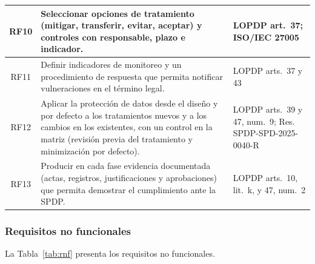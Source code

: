 \begin{table}[htbp]
\begin{tabularx}{\textwidth}{|c|L|p{3.6cm}|}
    \hline
    RF10 & Seleccionar opciones de tratamiento (mitigar, transferir, evitar, aceptar) y controles con responsable, plazo e indicador. & LOPDP art.~37; ISO/IEC 27005 \\
    \hline
    RF11 & Definir indicadores de monitoreo y un procedimiento de respuesta que permita notificar vulneraciones en el término legal. & LOPDP arts.~37 y 43 \\
    \hline
    RF12 & Aplicar la protección de datos desde el diseño y por defecto a los tratamientos nuevos y a los cambios en los existentes, con un control en la matriz (revisión previa del tratamiento y minimización por defecto). & LOPDP arts.~39 y 47, num.~9; Res. SPDP-SPD-2025-0040-R \\
    \hline
    RF13 & Producir en cada fase evidencia documentada (actas, registros, justificaciones y aprobaciones) que permita demostrar el cumplimiento ante la SPDP. & LOPDP arts.~10, lit.~k, y 47, num.~2 \\
    \hline
  \end{tabularx}
  \raggedright
\end{table}

\subsubsection{Requisitos no funcionales}

La Tabla~\ref{tab:rnf} presenta los requisitos no funcionales.

